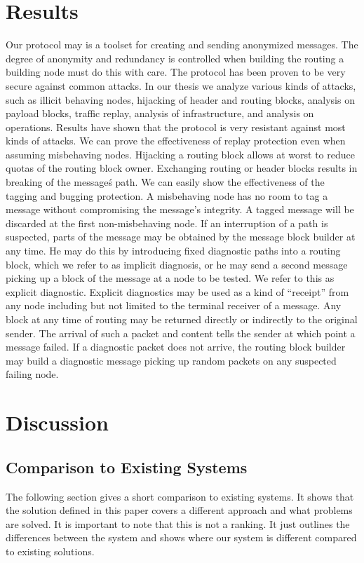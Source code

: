 \documentclass[runningheads]{llncs}
\begin{document}
\section{Results}
Our protocol may is a toolset for creating and sending anonymized messages. The degree of anonymity and redundancy is controlled when building the routing a building node must do this with care. The protocol has been proven to be very secure against common attacks. In our thesis\cite{messageVortex} we analyze various kinds of attacks, such as illicit behaving nodes, hijacking of header and routing blocks, analysis on payload blocks, traffic replay, analysis of infrastructure, and analysis on operations. Results have shown that the protocol is very resistant against most kinds of attacks. We can  prove the effectiveness of replay protection even when assuming misbehaving nodes. Hijacking a routing block allows at worst to reduce quotas of the routing block owner. Exchanging routing or header blocks results in breaking of the message\'s path. We can easily show the effectiveness of the tagging and bugging protection. A misbehaving node has no room to tag a message without compromising the message's integrity. A tagged message will be discarded at the first non-misbehaving node. If an interruption of a path is suspected, parts of the message may be obtained by the message block builder at any time. He may do this by introducing fixed diagnostic paths into a routing block, which we refer to as implicit diagnosis, or he may send a second message picking up a block of the message at a node to be tested. We refer to this as explicit diagnostic. Explicit diagnostics may be used as a kind of ``receipt'' from any node including but not limited to the terminal receiver of a message. Any block at any time of routing may be returned directly or indirectly to the original sender. The arrival of such a packet and content tells the sender at which point a message failed. If a diagnostic packet does not arrive, the routing block builder may build a diagnostic message picking up random packets on any suspected failing node.

\section{Discussion}

\subsection{Comparison to Existing Systems}
The following section gives a short comparison to existing systems. It shows that the solution defined in this paper covers a different approach and what problems are solved. It is important to note that this is not a ranking. It just outlines the differences between the system and shows where our system is different compared to existing solutions.
\end{document}
